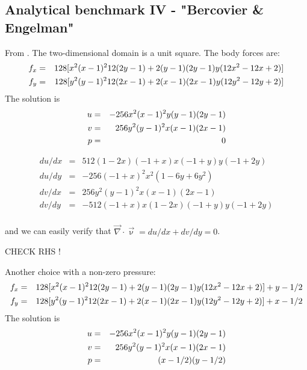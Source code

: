 \subsection{Analytical benchmark IV \label{mms4} - "Bercovier \& Engelman"}

From \cite{been79}. The two-dimensional domain is a unit square. The body forces are:
\begin{eqnarray}
f_x &=& 128[ x^2(x-1)^2 12 (2y-1) + 2 (y-1)(2y-1)y(12x^2-12x+2)  ] \nonumber\\
f_y &=& 128[ y^2(y-1)^2 12 (2x-1) + 2 (x-1)(2x-1)y(12y^2-12y+2)  ] \nonumber\\
\end{eqnarray}
The solution is
\begin{eqnarray}
u &=& -256x^2(x-1)^2y(y-1)(2y-1) \nonumber\\
v &=&  256y^2(y-1)^2x(x-1)(2x-1) \nonumber\\
p &=& 0 
\end{eqnarray}

\begin{eqnarray}
du/dx &=& 512 (1 - 2x) (-1+x) x(-1+y) y(-1+2y) \\ 
du/dy &=& -256 (-1 + x)^2 x^2 (1 - 6 y + 6 y^2) \\ 
dv/dx &=&  256y^2(y-1)^2x(x-1)(2x-1) \\ 
dv/dy &=& -512 (-1 + x) x (1 - 2 x) (-1 + y) y (-1 + 2 y) \\
\end{eqnarray}

and we can easily verify that $\vec\nabla\cdot\vec\upnu=du/dx+dv/dy=0$.

CHECK RHS !

Another choice with a non-zero pressure:
\begin{eqnarray}
f_x &=& 128[ x^2(x-1)^2 12 (2y-1) + 2 (y-1)(2y-1)y(12x^2-12x+2)  ] + y - 1/2 \nonumber\\
f_y &=& 128[ y^2(y-1)^2 12 (2x-1) + 2 (x-1)(2x-1)y(12y^2-12y+2)  ] + x - 1/2 \nonumber\\
\end{eqnarray}
The solution is
\begin{eqnarray}
u &=& -256x^2(x-1)^2y(y-1)(2y-1) \nonumber\\
v &=&  256y^2(y-1)^2x(x-1)(2x-1) \nonumber\\
p &=& (x-1/2)(y-1/2) 
\end{eqnarray}


